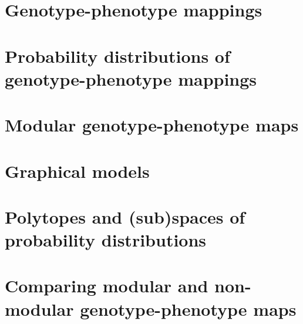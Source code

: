 

%

\newtoggle{thmsty}
\togglefalse{thmsty}

\newtoggle{longpres}
\togglefalse{longpres}









	\begin{frame}
		\titlepage
	\end{frame}
	
	
	
	
	
	\section[GP maps]{Genotype-phenotype mappings}
	
		
	\section[PDs of GPs]{Probability distributions of genotype-phenotype mappings}
    

	\section[Modular GPs]{Modular genotype-phenotype maps}
	

	\section[GMs]{Graphical models}
	

	\section[PTs and PDs]{Polytopes and (sub)spaces of probability distributions}
		

	\section[PD comp]{Comparing modular and non-modular genotype-phenotype maps}
	
	
	
	
	
	
%	
	

